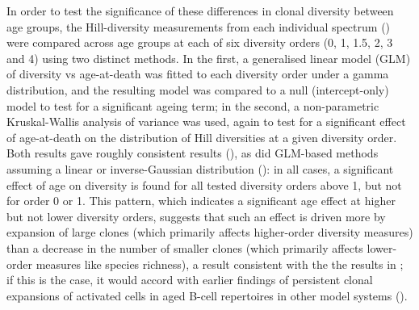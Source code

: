 In order to test the significance of these differences in clonal diversity between age groups, the Hill-diversity measurements from each individual spectrum () were compared across age groups at each of six diversity orders (0, 1, 1.5, 2, 3 and 4) using two distinct methods. In the first, a generalised linear model (GLM) of diversity vs age-at-death was fitted to each diversity order under a gamma distribution, and the resulting model was compared to a null (intercept-only) model to test for a significant ageing term; in the second, a non-parametric Kruskal-Wallis analysis of variance was used, again to test for a significant effect of age-at-death on the distribution of Hill diversities at a given diversity order. Both results gave roughly consistent results (), as did GLM-based methods assuming a linear or inverse-Gaussian distribution (): in all cases, a significant effect of age on diversity is found for all tested diversity orders above 1, but not for order 0 or 1. This pattern, which indicates a significant age effect at higher but not lower diversity orders, suggests that such an effect is driven more by expansion of large clones (which primarily affects higher-order diversity measures) than a decrease in the number of smaller clones (which primarily affects lower-order measures like species richness), a result consistent with the the results in ; if this is the case, it would accord with earlier findings of persistent clonal expansions of activated cells in aged B-cell repertoires in other model systems ().

